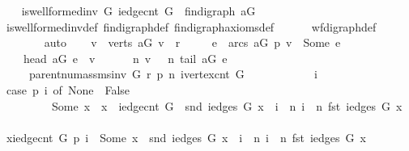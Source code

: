 \begin{isabellebody}
\ \ \isamarkupfalse%
\ {\isachardoublequoteopen}is{\isacharunderscore}wellformed{\isacharunderscore}inv\ G\ {\isacharparenleft}iedge{\isacharunderscore}cnt\ G{\isacharparenright}\ {\isacharequal}\ fin{\isacharunderscore}digraph\ {\isacharquery}aG{\isachardoublequoteclose}\isanewline
\ \ \ \ \isamarkupfalse%
\ is{\isacharunderscore}wellformed{\isacharunderscore}inv{\isacharunderscore}def\ fin{\isacharunderscore}digraph{\isacharunderscore}def\ fin{\isacharunderscore}digraph{\isacharunderscore}axioms{\isacharunderscore}def\isanewline
\ \ \ \ \ \ wf{\isacharunderscore}digraph{\isacharunderscore}def\ \isanewline
\ \ \ \ \ \ \isamarkupfalse%
\ auto\isanewline
{}\isamarkupfalse%
\isanewline
\ \ \isamarkupfalse%
\ {\isachardoublequoteopen}{\isacharparenleft}{\isasymforall}v\ {\isasymin}\ verts\ {\isacharquery}aG{\isachardot}\ v\ {\isasymnoteq}\ r\ {\isasymlongrightarrow}\isanewline
\ \ \ \ {\isacharparenleft}{\isasymexists}e\ {\isasymin}\ arcs\ {\isacharquery}aG{\isachardot}\ p\ v\ {\isacharequal}\ Some\ e\ {\isasymand}\ \isanewline
\ \ \ \ head\ {\isacharquery}aG\ e\ {\isacharequal}\ v\ {\isasymand}\ \isanewline
\ \ \ \ n\ v\ {\isacharequal}\ \ n\ {\isacharparenleft}tail\ {\isacharquery}aG\ e{\isacharparenright}\ {\isacharplus}\ {}{\isacharparenright}{\isacharparenright}\ \isanewline
\ \ \ \ {\isacharequal}\ parent{\isacharunderscore}num{\isacharunderscore}assms{\isacharunderscore}inv\ G\ r\ p\ n\ {\isacharparenleft}ivertex{\isacharunderscore}cnt\ G{\isacharparenright}{\isachardoublequoteclose}\isanewline
\ \ \isamarkupfalse%
\ {\isacharminus}\isanewline
\ \ \ \ \isacommand{{\isacharbraceleft}}\isamarkupfalse%
\ \isamarkupfalse%
\ i\ \isamarkupfalse%
\ {\isachardoublequoteopen}{\isacharparenleft}case\ p\ i\ of\ None\ {\isasymRightarrow}\ False\isanewline
\ \ \ \ \ \ \ \ {\isacharbar}\ Some\ x\ {\isasymRightarrow}\ x\ {\isacharless}\ iedge{\isacharunderscore}cnt\ G\ {\isasymand}\ snd\ {\isacharparenleft}iedges\ G\ x{\isacharparenright}\ {\isacharequal}\ i\ {\isasymand}\ n\ i\ {\isacharequal}\ n\ {\isacharparenleft}fst\ {\isacharparenleft}iedges\ G\ x{\isacharparenright}{\isacharparenright}\ {\isacharplus}\ {}{\isacharparenright}{\isachardoublequoteclose}\isanewline
\ \ \ \ \ \ \isamarkupfalse%
\ \isamarkupfalse%
\ {\isachardoublequoteopen}{\isasymexists}x{\isasymin}{\isacharbraceleft}{}{\isachardot}{\isachardot}{\isacharless}iedge{\isacharunderscore}cnt\ G{\isacharbraceright}{\isachardot}\ p\ i\ {\isacharequal}\ Some\ x\ {\isasymand}\ snd\ {\isacharparenleft}iedges\ G\ x{\isacharparenright}\ {\isacharequal}\ i\ {\isasymand}\ n\ i\ {\isacharequal}\ n\ {\isacharparenleft}fst\ {\isacharparenleft}iedges\ G\ x{\isacharparenright}{\isacharparenright}\ {\isacharplus}\ {}{\isachardoublequoteclose}\isanewline

\end{isabellebody}
